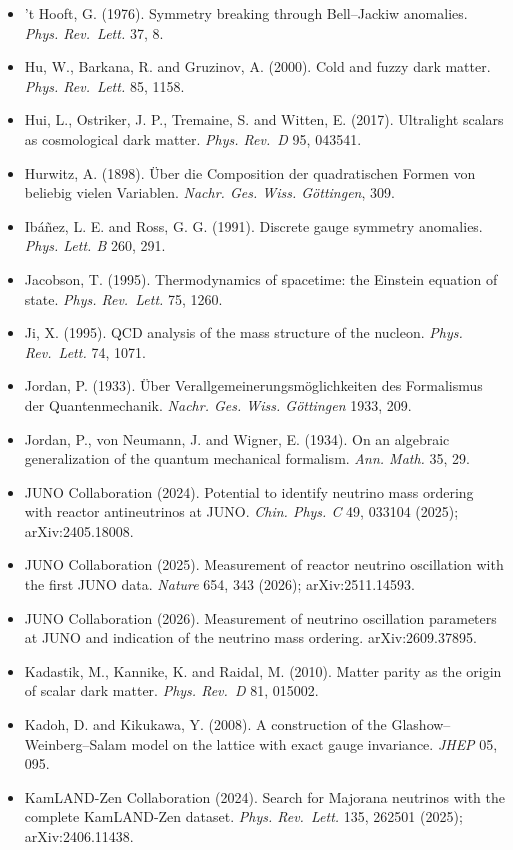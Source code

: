 \documentclass[
  11pt,
]{article}
\begin{document}
\begin{itemize}
\item
  't Hooft, G. (1976). Symmetry breaking through Bell--Jackiw anomalies. \emph{Phys. Rev.~Lett.} 37, 8.
\item
  Hu, W., Barkana, R. and Gruzinov, A. (2000). Cold and fuzzy dark matter. \emph{Phys. Rev.~Lett.} 85, 1158.
\item
  Hui, L., Ostriker, J. P., Tremaine, S. and Witten, E. (2017). Ultralight scalars as cosmological dark matter. \emph{Phys. Rev.~D} 95, 043541.
\item
  Hurwitz, A. (1898). Über die Composition der quadratischen Formen von beliebig vielen Variablen. \emph{Nachr. Ges. Wiss. Göttingen}, 309.
\item
  Ibáñez, L. E. and Ross, G. G. (1991). Discrete gauge symmetry anomalies. \emph{Phys. Lett. B} 260, 291.
\item
  Jacobson, T. (1995). Thermodynamics of spacetime: the Einstein equation of state. \emph{Phys. Rev.~Lett.} 75, 1260.
\item
  Ji, X. (1995). QCD analysis of the mass structure of the nucleon. \emph{Phys. Rev.~Lett.} 74, 1071.
\item
  Jordan, P. (1933). Über Verallgemeinerungsmöglichkeiten des Formalismus der Quantenmechanik. \emph{Nachr. Ges. Wiss. Göttingen} 1933, 209.
\item
  Jordan, P., von Neumann, J. and Wigner, E. (1934). On an algebraic generalization of the quantum mechanical formalism. \emph{Ann. Math.} 35, 29.
\item
  JUNO Collaboration (2024). Potential to identify neutrino mass ordering with reactor antineutrinos at JUNO. \emph{Chin. Phys. C} 49, 033104 (2025); arXiv:2405.18008.
\item
  JUNO Collaboration (2025). Measurement of reactor neutrino oscillation with the first JUNO data. \emph{Nature} 654, 343 (2026); arXiv:2511.14593.
\item
  JUNO Collaboration (2026). Measurement of neutrino oscillation parameters at JUNO and indication of the neutrino mass ordering. arXiv:2609.37895.
\item
  Kadastik, M., Kannike, K. and Raidal, M. (2010). Matter parity as the origin of scalar dark matter. \emph{Phys. Rev.~D} 81, 015002.
\item
  Kadoh, D. and Kikukawa, Y. (2008). A construction of the Glashow--Weinberg--Salam model on the lattice with exact gauge invariance. \emph{JHEP} 05, 095.
\item
  KamLAND-Zen Collaboration (2024). Search for Majorana neutrinos with the complete KamLAND-Zen dataset. \emph{Phys. Rev.~Lett.} 135, 262501 (2025); arXiv:2406.11438.

\end{itemize}
\end{document}
